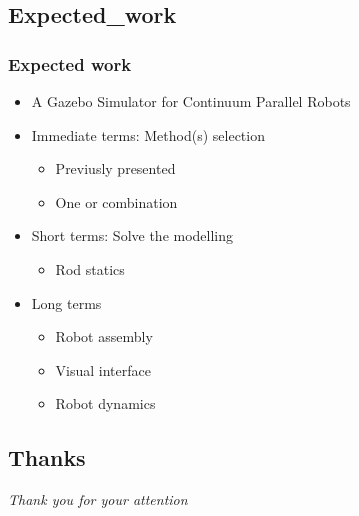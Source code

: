 \documentclass[compress]{thesisbeamer}
\begin{document}
      	\subsection{Expected_work}
        \begin{frame}
        	\frametitle{Expected work}
        	\begin{itemize}
        		\item A Gazebo Simulator for Continuum Parallel Robots
        		\item Immediate terms: Method(s) selection
        		\begin{itemize}
        			\item Previusly presented 
        			\item One or combination
        		\end{itemize}
        		\item Short terms: Solve the modelling
  				\begin{itemize}%
   					\item Rod statics
        		\end{itemize}
        		\item Long terms
  				\begin{itemize}%
   					\item Robot assembly
   					\item Visual interface
   					\item Robot dynamics
  				\end{itemize}
        	\end{itemize}
        \end{frame}
        	
        \subsection{Thanks}
        \begin{frame}
  			\centering \Large
  			\emph{Thank you for your attention}
        \end{frame}
        
\begin{frame}
	\printbibliography
\end{frame}
        	
\end{document}
